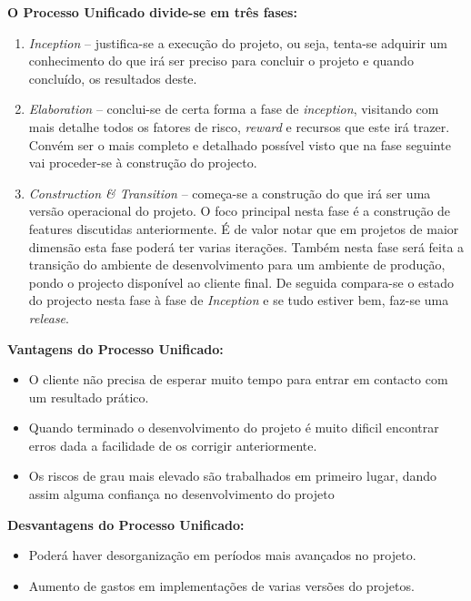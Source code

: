 \documentclass[12pt, a4paper, twoside]{report} %
\begin{document}
\textbf{O Processo Unificado divide-se em três fases:}
\\

\begin{enumerate}
\item \textit{Inception} – justifica-se a execução do projeto, ou seja, tenta-se adquirir um conhecimento do que irá ser preciso para concluir o projeto e quando concluído, os resultados deste.

\item \textit{Elaboration} – conclui-se de certa forma a fase de \textit{inception}, visitando com mais detalhe todos os fatores de risco, \textit{reward} e recursos que este irá trazer. Convém ser o mais completo e detalhado possível visto que na fase seguinte vai proceder-se à construção do projecto.

\item \textit{Construction \& Transition} – começa-se a construção do que irá ser uma versão operacional do projeto. O foco principal nesta fase é a construção de features discutidas anteriormente. É de valor notar que em projetos de maior dimensão esta fase poderá ter varias iterações. Também nesta fase será feita a transição do ambiente de desenvolvimento para um ambiente de produção, pondo o projecto disponível ao cliente final. De seguida compara-se o estado do projecto nesta fase à fase de \textit{Inception} e se tudo estiver bem, faz-se uma \textit{release}. 


\end{enumerate}

\textbf{Vantagens do Processo Unificado:}
\begin{itemize}
\item O cliente não precisa de esperar muito tempo para entrar em contacto com um resultado prático.
\item Quando terminado o desenvolvimento do projeto é muito dificil encontrar erros dada a facilidade de os corrigir anteriormente.
\item Os riscos de grau mais elevado são trabalhados em primeiro lugar, dando assim alguma confiança no desenvolvimento do projeto
\end{itemize}

\textbf{Desvantagens do Processo Unificado:}
\begin{itemize}
\item Poderá haver desorganização em períodos mais avançados no projeto.
\item Aumento de gastos em implementações de varias versões do projetos.
\end{itemize}
\end{document}
